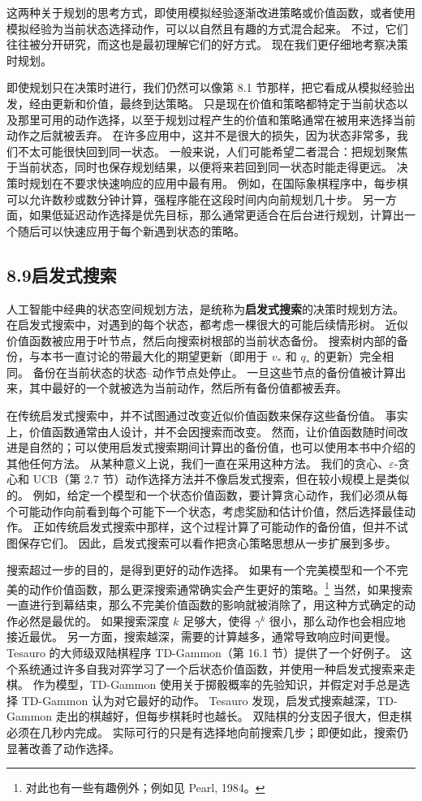 \documentclass[UTF8,12pt,a4paper,fontset=fandol]{ctexart}
\begin{document}
这两种关于规划的思考方式，即使用模拟经验逐渐改进策略或价值函数，或者使用模拟经验为当前状态选择动作，可以以自然且有趣的方式混合起来。
不过，它们往往被分开研究，而这也是最初理解它们的好方式。
现在我们更仔细地考察决策时规划。

即使规划只在决策时进行，我们仍然可以像第 8.1 节那样，把它看成从模拟经验出发，经由更新和价值，最终到达策略。
只是现在价值和策略都特定于当前状态以及那里可用的动作选择，以至于规划过程产生的价值和策略通常在被用来选择当前动作之后就被丢弃。
在许多应用中，这并不是很大的损失，因为状态非常多，我们不太可能很快回到同一状态。
一般来说，人们可能希望二者混合：把规划聚焦于当前状态，同时也保存规划结果，以便将来若回到同一状态时能走得更远。
决策时规划在不要求快速响应的应用中最有用。
例如，在国际象棋程序中，每步棋可以允许数秒或数分钟计算，强程序能在这段时间内向前规划几十步。
另一方面，如果低延迟动作选择是优先目标，那么通常更适合在后台进行规划，计算出一个随后可以快速应用于每个新遇到状态的策略。

\subsection*{8.9\quad 启发式搜索}

人工智能中经典的状态空间规划方法，是统称为\textbf{启发式搜索}的决策时规划方法。
在启发式搜索中，对遇到的每个状态，都考虑一棵很大的可能后续情形树。
近似价值函数被应用于叶节点，然后向搜索树根部的当前状态备份。
搜索树内部的备份，与本书一直讨论的带最大化的期望更新（即用于 $v_*$ 和 $q_*$ 的更新）完全相同。
备份在当前状态的状态--动作节点处停止。
一旦这些节点的备份值被计算出来，其中最好的一个就被选为当前动作，然后所有备份值都被丢弃。

在传统启发式搜索中，并不试图通过改变近似价值函数来保存这些备份值。
事实上，价值函数通常由人设计，并不会因搜索而改变。
然而，让价值函数随时间改进是自然的；可以使用启发式搜索期间计算出的备份值，也可以使用本书中介绍的其他任何方法。
从某种意义上说，我们一直在采用这种方法。
我们的贪心、$\varepsilon$-贪心和 UCB（第 2.7 节）动作选择方法并不像启发式搜索，但在较小规模上是类似的。
例如，给定一个模型和一个状态价值函数，要计算贪心动作，我们必须从每个可能动作向前看到每个可能下一个状态，考虑奖励和估计价值，然后选择最佳动作。
正如传统启发式搜索中那样，这个过程计算了可能动作的备份值，但并不试图保存它们。
因此，启发式搜索可以看作把贪心策略思想从一步扩展到多步。

搜索超过一步的目的，是得到更好的动作选择。
如果有一个完美模型和一个不完美的动作价值函数，那么更深搜索通常确实会产生更好的策略。\footnote{对此也有一些有趣例外；例如见 Pearl, 1984。}
当然，如果搜索一直进行到幕结束，那么不完美价值函数的影响就被消除了，用这种方式确定的动作必然是最优的。
如果搜索深度 $k$ 足够大，使得 $\gamma^k$ 很小，那么动作也会相应地接近最优。
另一方面，搜索越深，需要的计算越多，通常导致响应时间更慢。
Tesauro 的大师级双陆棋程序 TD-Gammon（第 16.1 节）提供了一个好例子。
这个系统通过许多自我对弈学习了一个后状态价值函数，并使用一种启发式搜索来走棋。
作为模型，TD-Gammon 使用关于掷骰概率的先验知识，并假定对手总是选择 TD-Gammon 认为对它最好的动作。
Tesauro 发现，启发式搜索越深，TD-Gammon 走出的棋越好，但每步棋耗时也越长。
双陆棋的分支因子很大，但走棋必须在几秒内完成。
实际可行的只是有选择地向前搜索几步；即便如此，搜索仍显著改善了动作选择。
\end{document}
